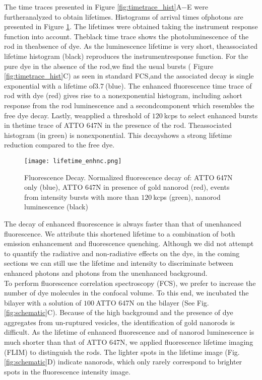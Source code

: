 The time traces presented in Figure \ref{fig:timetrace_hist}A−E were furtheranalyzed to obtain lifetimes. Histograms of arrival times ofphotons are presented in Figure \ref{fig:lifetime_enhnc}. The lifetimes were obtained taking the instrument response function into account. Theblack time trace shows the photoluminescence of the rod in theabsence of dye. As the luminescence lifetime is very short, theassociated lifetime histogram (black) reproduces the instrumentresponse function. For the pure dye in the absence of the rod,we ﬁnd the usual bursts ( Figure \ref{fig:timetrace_hist}C) as seen in standard FCS,and the associated decay is single exponential with a lifetime of$3.7~$\ns (blue). The enhanced ﬂuorescence time trace of rod with dye (red) gives rise to a nonexponential histogram, including ashort response from the rod luminescence and a secondcomponent which resembles the free dye decay. Lastly, weapplied a threshold of $120~$kcps to select enhanced bursts in thetime trace of ATTO 647N in the presence of the rod. Theassociated histogram (in green) is nonexponential. This decayshows a strong lifetime reduction compared to the free dye.\\
\begin{figure}
	\centering
	\texttt{[image: lifetime\_enhnc.png]}
	\caption{Fluorescence Decay. Normalized fluorescence decay of: ATTO 647N only (blue), ATTO 647N in presence of gold nanorod (red), events from intensity bursts with more than $120~$kcps (green), nanorod luminescence (black)}
	\label{fig:lifetime_enhnc}
\end{figure}
The decay of enhanced fluorescence is always faster than that of unenhanced fluorescence. We attribute this shortened lifetime to a combination of both emission enhancement and fluorescence quenching. Although we did not attempt to quantify the radiative and non-radiative effects on the dye, in the coming sections we can still use the lifetime and intensity to discriminate between enhanced photons and photons from the unenhanced background.\\
To perform fluorescence correlation spectroscopy (FCS), we prefer to increase the number of dye molecules in the confocal volume. To this end, we incubated the bilayer with a solution of $100~$\nM ATTO 647N on the bilayer (See Fig. \ref{fig:schematic}C). Because of the high background and the presence of dye aggregates from un-ruptured vesicles, the identification of gold nanorods is difficult. As the lifetime of enhanced fluorescence and of nanorod luminescence is much shorter than that of ATTO 647N, we applied fluorescence lifetime imaging (FLIM) to distinguish the rods. The lighter spots in the lifetime image (Fig.\ref{fig:schematic}D) indicate nanorods, which only rarely correspond to brighter spots in the fluorescence intensity image.\\
